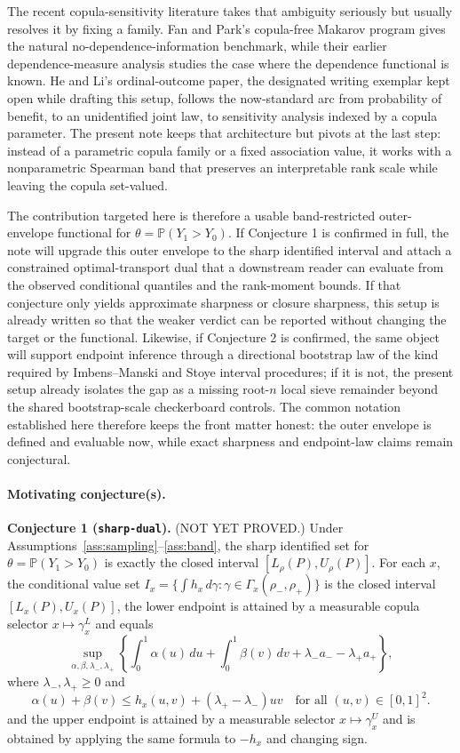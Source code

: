 \documentclass[11pt]{article}
\renewcommand{\Pr}{\mathbb{P}}
\theoremstyle{definition}
\theoremstyle{plain}
\theoremstyle{remark}
\begin{document}
The recent copula-sensitivity literature takes that ambiguity seriously but usually resolves it by fixing a family.  Fan and Park's copula-free Makarov program gives the natural no-dependence-information benchmark, while their earlier dependence-measure analysis studies the case where the dependence functional is known.  He and Li's ordinal-outcome paper, the designated writing exemplar kept open while drafting this setup, follows the now-standard arc from probability of benefit, to an unidentified joint law, to sensitivity analysis indexed by a copula parameter.  The present note keeps that architecture but pivots at the last step: instead of a parametric copula family or a fixed association value, it works with a nonparametric Spearman band that preserves an interpretable rank scale while leaving the copula set-valued.

The contribution targeted here is therefore a usable band-restricted outer-envelope functional for \(\theta=\Pr(Y_1>Y_0)\).  If Conjecture 1 is confirmed in full, the note will upgrade this outer envelope to the sharp identified interval and attach a constrained optimal-transport dual that a downstream reader can evaluate from the observed conditional quantiles and the rank-moment bounds.  If that conjecture only yields approximate sharpness or closure sharpness, this setup is already written so that the weaker verdict can be reported without changing the target or the functional.  Likewise, if Conjecture 2 is confirmed, the same object will support endpoint inference through a directional bootstrap law of the kind required by Imbens--Manski and Stoye interval procedures; if it is not, the present setup already isolates the gap as a missing root-\(n\) local sieve remainder beyond the shared bootstrap-scale checkerboard controls.  The common notation established here therefore keeps the front matter honest: the outer envelope is defined and evaluable now, while exact sharpness and endpoint-law claims remain conjectural.

\paragraph{Motivating conjecture(s).}
\textbf{Conjecture 1 (\texttt{sharp-dual}).} (NOT YET PROVED.)  Under Assumptions~\ref{ass:sampling}--\ref{ass:band}, the sharp identified set for \(\theta=\Pr(Y_1>Y_0)\) is exactly the closed interval \([L_\rho(P),U_\rho(P)]\).  For each \(x\), the conditional value set \(I_x=\{\int h_x\,d\gamma:\gamma\in\Gamma_x(\rho_-,\rho_+)\}\) is the closed interval \([L_x(P),U_x(P)]\), the lower endpoint is attained by a measurable copula selector \(x\mapsto\gamma_x^L\) and equals
\[
\sup_{\alpha,\beta,\lambda_-,\lambda_+}
\left\{\int_0^1\alpha(u)\,du+\int_0^1\beta(v)\,dv+\lambda_-a_- - \lambda_+a_+\right\},
\]
where \(\lambda_-,\lambda_+\ge0\) and
\[
\alpha(u)+\beta(v)\le h_x(u,v)+(\lambda_+-\lambda_-)uv\quad\text{for all }(u,v)\in[0,1]^2.
\]
and the upper endpoint is attained by a measurable selector \(x\mapsto\gamma_x^U\) and is obtained by applying the same formula to \(-h_x\) and changing sign.
\end{document}
